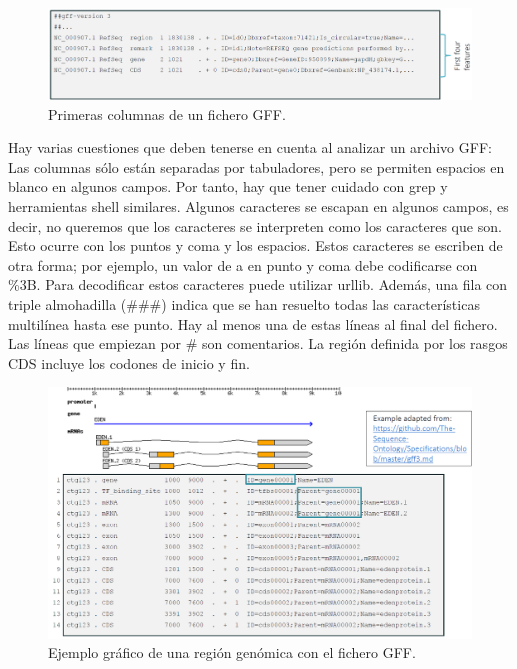 \begin{figure}[htbp]
\centering
\includegraphics[width = \textwidth]{figs/gff.png}
\caption{Primeras columnas de un fichero GFF.}
\label{fig:gff}
\end{figure}

Hay varias cuestiones que deben tenerse en cuenta al analizar un archivo GFF: Las columnas sólo están separadas por tabuladores, pero se permiten espacios en blanco en algunos campos. Por tanto, hay que tener cuidado con grep y herramientas shell similares. Algunos caracteres se escapan en algunos campos, es decir, no queremos que los caracteres se interpreten como los caracteres que son. Esto ocurre con los puntos y coma y los espacios. Estos caracteres se escriben de otra forma; por ejemplo, un valor de a en punto y coma debe codificarse con \%3B. Para decodificar estos caracteres puede utilizar urllib. Además, una fila con triple almohadilla (\#\#\#) indica que se han resuelto todas las características multilínea hasta ese punto. Hay al menos una de estas líneas al final del fichero. Las líneas que empiezan por \# son comentarios. La región definida por los rasgos CDS incluye los codones de inicio y fin.

\begin{figure}[htbp]
\centering
\includegraphics[width = \textwidth]{figs/gff-graph.png}
\caption{Ejemplo gráfico de una región genómica con el fichero GFF.}
\label{fig:gff-graph}
\end{figure}

